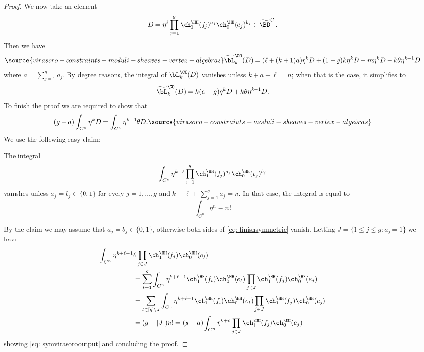 \begin{proof}
    We now take an element
    \[D=\eta^\ell \prod_{j=1}^g\ch_1^\HH(f_j)^{a_j} \ch_0^\HH(e_j)^{b_j}\in \widetilde \BD^C\,.\]
Then we have
\begin{equation}
\label{eq: symvirasorooutput}
\source{virasoro-constraints-moduli-sheaves-vertex-algebras}
    \widetilde \bL_k^\CO(D)=(\ell+(k+1)a)\eta^k \nonumber D+(1-g)k \eta^k D-m \eta^k D+k \theta \eta^{k-1}D
\end{equation}
where $a=\sum_{j=1}^g a_j$. By degree reasons, the integral of $\bL_k^\CO(D)$ vanishes unless $k+a+\ell=n$; when that is the case, it simplifies to
\[\widetilde \bL_k^\CO(D)=
k(a-g)\eta^k D+k \theta\eta^{k-1}D.\]
To finish the proof we are required to show that
\begin{equation}
(g-a)\int_{C^n} \eta^k D=\int_{C^n} \eta^{k-1}\theta D.    \label{eq: finishsymmetric}
\source{virasoro-constraints-moduli-sheaves-vertex-algebras}
\end{equation}
We use the following easy claim:
\begin{claim}
\notready
The integral
\[\int_{C^n} \eta^{k+\ell} \prod_{i=1}^g\ch_1^\HH(f_j)^{a_j} \ch_0^\HH(e_j)^{b_j}\]
vanishes unless $a_j=b_j\in \{0,1\}$ for every $j=1, \ldots, g$ and $k+\ell+\sum_{j=1}^g a_j=n$. In that case, the integral is equal to
\[\int_{C^n}\eta^n=n!\]
\end{claim}
By the claim we may assume that $a_j=b_j\in \{0,1\}$, otherwise both sides of \eqref{eq: finishsymmetric} vanish. Letting $J=\{1\leq j\leq g\colon a_j=1\}$ we have
\begin{align*}
\int_{C^n}\eta^{k+\ell-1}&\theta \prod_{j\in J}\ch_1^\HH(f_j)\ch_0^\HH(e_j)\\
&=\sum_{t=1}^g \int_{C^n}\eta^{k+\ell-1}\ch_1^\HH(f_t)\ch_0^\HH(e_t)\prod_{j\in J}\ch_1^\HH(f_j)\ch_0^\HH(e_j)\\
&=\sum_{t\in [g]\setminus J} \int_{C^n}\eta^{k+\ell-1}\ch_1^\HH(f_t)\ch_0^\HH(e_t)\prod_{j\in J}\ch_1^\HH(f_j)\ch_0^\HH(e_j)\\
&=(g-|J|)n!=(g-a)\int_{C^n} \eta^{k+\ell} \prod_{j\in J}\ch_1^\HH(f_j)\ch_0^\HH(e_j)
\end{align*}
showing \eqref{eq: symvirasorooutput} and concluding the proof.\qedhere
\end{proof}


